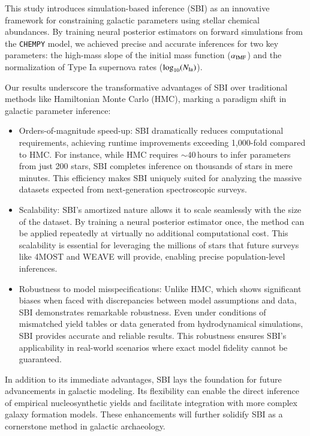 \documentclass{aa}
\begin{document}
This study introduces simulation-based inference (SBI) as an innovative framework for constraining galactic parameters using stellar chemical abundances. By training neural posterior estimators on forward simulations from the \texttt{CHEMPY} model, we achieved precise and accurate inferences for two key parameters: the high-mass slope of the initial mass function ($\alpha_{\rm IMF}$) and the normalization of Type Ia supernova rates ($\log_{10}(N_{\rm Ia})$).

Our results underscore the transformative advantages of SBI over traditional methods like Hamiltonian Monte Carlo (HMC), marking a paradigm shift in galactic parameter inference:
\begin{itemize}
    \item Orders-of-magnitude speed-up: SBI dramatically reduces computational requirements, achieving runtime improvements exceeding 1,000-fold compared to HMC. For instance, while HMC requires $\sim 40\,\mathrm{hours}$ to infer parameters from just 200 stars, SBI completes inference on thousands of stars in mere minutes. This efficiency makes SBI uniquely suited for analyzing the massive datasets expected from next-generation spectroscopic surveys.
    \item Scalability: SBI’s amortized nature allows it to scale seamlessly with the size of the dataset. By training a neural posterior estimator once, the method can be applied repeatedly at virtually no additional computational cost. This scalability is essential for leveraging the millions of stars that future surveys like 4MOST and WEAVE will provide, enabling precise population-level inferences.
    \item Robustness to model misspecifications: Unlike HMC, which shows significant biases when faced with discrepancies between model assumptions and data, SBI demonstrates remarkable robustness. Even under conditions of mismatched yield tables or data generated from hydrodynamical simulations, SBI provides accurate and reliable results. This robustness ensures SBI’s applicability in real-world scenarios where exact model fidelity cannot be guaranteed.
\end{itemize}

In addition to its immediate advantages, SBI lays the foundation for future advancements in galactic modeling. Its flexibility can enable the direct inference of empirical nucleosynthetic yields and facilitate integration with more complex galaxy formation models. These enhancements will further solidify SBI as a cornerstone method in galactic archaeology.
\end{document}
